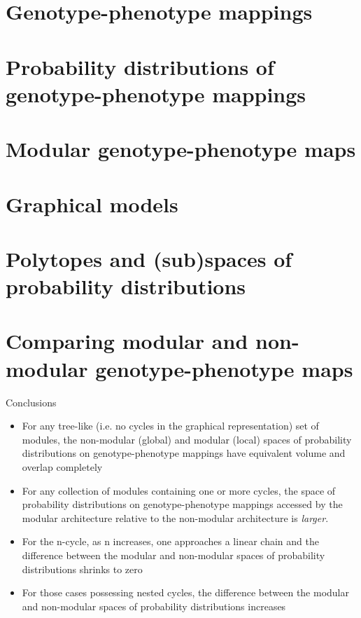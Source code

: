 	\section[GP maps]{Genotype-phenotype mappings}
	
		
	\section[PDs of GPs]{Probability distributions of genotype-phenotype mappings}
    

	\section[Modular GPs]{Modular genotype-phenotype maps}
	
	
	\section[GMs]{Graphical models}
	

	\section[PTs and PDs]{Polytopes and (sub)spaces of probability distributions}
		

	\section[PD comp]{Comparing modular and non-modular genotype-phenotype maps}
	
	
	\begin{frame}
	\begin{block}{Conclusions}
	\begin{small}	
	\begin{itemize}
	\item For any tree-like (i.e. no cycles in the graphical representation) set of modules, the non-modular (global) and modular (local) spaces of probability distributions on genotype-phenotype mappings have equivalent volume and overlap completely
	\item For any collection of modules containing one or more cycles, the space of probability distributions on genotype-phenotype mappings accessed by the modular architecture relative to the non-modular architecture is \emph{larger}.
	\item For the n-cycle, as n increases, one approaches a linear chain and the difference between the modular and non-modular spaces of probability distributions shrinks to zero
	\item For those cases possessing nested cycles, the difference between the modular and non-modular spaces of probability distributions increases
	\end{itemize}		
	\end{small}
	\end{block}
	\end{frame}
	
